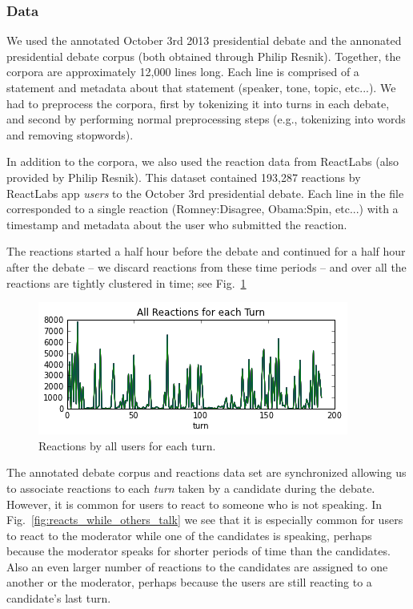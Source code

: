 
\subsubsection{Data}

We used the annotated October 3rd 2013 presidential debate and the annonated presidential debate corpus (both obtained through Philip Resnik).
Together, the corpora are approximately 12,000 lines long.
Each line is comprised of a statement and metadata about that statement (speaker, tone, topic, etc...).
We had to preprocess the corpora, first by tokenizing it into turns in each debate, and second by performing normal preprocessing steps (e.g., tokenizing into words and removing stopwords).

In addition to the corpora, we also used the reaction data from ReactLabs (also provided by Philip Resnik).
This dataset contained 193,287 reactions by ReactLabs app \emph{users} to the October 3rd presidential debate.
Each line in the file corresponded to a single reaction (Romney:Disagree, Obama:Spin, etc...) with a timestamp and metadata about the user who submitted the reaction.

The reactions started a half hour before the debate and continued for a half hour after the debate -- we discard reactions from these time periods -- and over all the reactions are tightly clustered in time; see Fig.~\ref{fig:reactionseachturn}

\begin{figure}[]
	\centering
	\includegraphics[scale=0.6]{Figures/reactions_for_each_turn.png}
	\caption{Reactions by all users for each turn.}
	\label{fig:reactionseachturn}
\end{figure}

The annotated debate corpus and reactions data set are synchronized allowing us to associate reactions to each \emph{turn} taken by a candidate during the debate.  However, it is common for users to react to someone who is not speaking.  In Fig.~\ref{fig:reacts_while_others_talk} we see that it is especially common for users to react to the moderator while one of the candidates is speaking, perhaps because the moderator speaks for shorter periods of time than the candidates.  Also an even larger number of reactions to the candidates are assigned to one another or the moderator, perhaps because the users are still reacting to a candidate's last turn.

